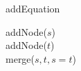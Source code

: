 \begin{algorithm}[t]
\caption[.]{addEquation}
	
	addNode($s$) \\
	addNode($t$) \\
	merge($s, t, s=t$)
  
  \label{algo:addEquation}
\end{algorithm}
